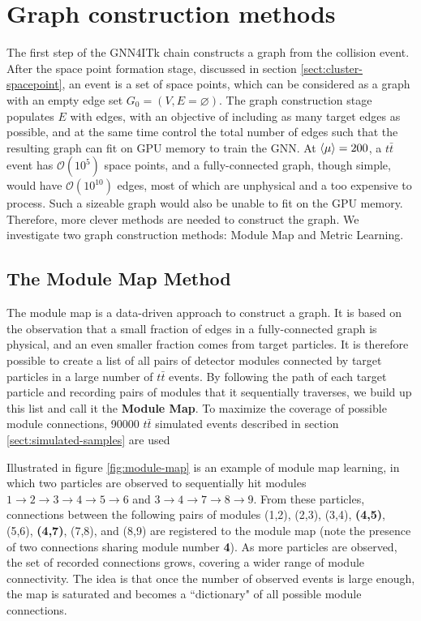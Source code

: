 \section{Graph construction methods}
\label{sect:graph-construction}
The first step of the GNN4ITk chain constructs a graph from the collision event. 
After the space point formation stage, discussed in section \ref{sect:cluster-spacepoint}, an event is a set of space points, which can be considered as a graph with an empty edge set $G_0=(V, E=\varnothing)$. 
The graph construction stage populates $E$ with edges, with an objective of including as many target edges as possible, and at the same time control the total number of edges such that the resulting graph can fit on GPU memory to train the GNN. 
At $\expval{\mu}=200$, a $t\bar{t}$ event has $\mathcal{O}(10^5)$ space points, and a fully-connected graph, though simple, would have $\mathcal{O}(10^{10})$ edges, most of which are unphysical and a too expensive to process.
Such a sizeable graph would also be unable to fit on the GPU memory. 
Therefore, more clever methods are needed to construct the graph. 
We investigate two graph construction methods: Module Map and Metric Learning. 

\subsection{The Module Map Method}
\label{subsect:module-map}

The module map is a data-driven approach to construct a graph. 
It is based on the observation that a small fraction of edges in a fully-connected graph is physical, and an even smaller fraction comes from target particles.
It is therefore possible to create a list of all pairs of detector modules connected by target particles in a large number of $t\bar{t}$ events. 
By following the path of each target particle and recording pairs of modules that it sequentially traverses, we build up this list and call it the \textbf{Module Map}. 
To maximize the coverage of possible module connections, 90000 $t\bar{t}$ simulated events described in section \ref{sect:simulated-samples} are used

Illustrated in figure \ref{fig:module-map} is an example of module map learning, in which two particles are observed to sequentially hit modules $1\rightarrow2\rightarrow 3 \rightarrow 4 \rightarrow 5 \rightarrow 6$ and $3\rightarrow 4 \rightarrow 7 \rightarrow 8 \rightarrow 9$. 
From these particles, connections between the following pairs of modules (1,2), (2,3), (3,4), \textbf{(4,5)}, (5,6), \textbf{(4,7)}, (7,8), and (8,9) are registered to the module map (note the presence of two connections sharing module number \textbf{4}). 
As more particles are observed, the set of recorded connections grows, covering a wider range of module connectivity.
The idea is that once the number of observed events is large enough, the map is saturated and becomes a ``dictionary" of all possible module connections.

